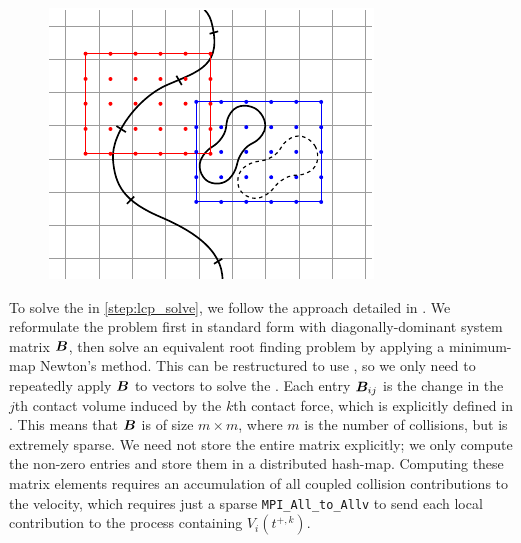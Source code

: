\begin{figure}[h]
\centering
\begin{minipage}[b]{0.48\textwidth}
    \centering
    \includegraphics[angle=0,width=.7\linewidth]{figs/grid_and_check_points.pdf}
\end{minipage}
\end{figure}%
To solve the \lcp in \cref{step:lcp_solve}, we follow the approach
detailed in \cite[Section 3.2.2, Section 3.3]{lu2017}. 
We reformulate the problem first in standard \lcp form with diagonally-dominant system matrix $\bm{B}$, then 
solve an equivalent root finding problem by applying a minimum-map Newton's
method. This can be restructured to use \gmres, so we only need to repeatedly apply  
$\bm{B}$ to vectors to solve the \lcp.
Each entry $\bm{B}_{ij}$ is the change in the $j$th contact volume induced by the
$k$th contact force, which is explicitly defined in
\cite[Algorithm 3]{lu2018parallel}.
This means that $\bm{B}$ is of size $m \times m$, where $m$ is the number of
collisions, but is extremely sparse.
We need not store the entire matrix explicitly; we only compute the non-zero entries and
store them in a distributed hash-map.
Computing these matrix elements requires an accumulation of all coupled
collision contributions to the velocity, which requires just a sparse
\texttt{MPI\_All\_to\_Allv} to send each local contribution to the process containing
$V_i(t^{+,k})$.

